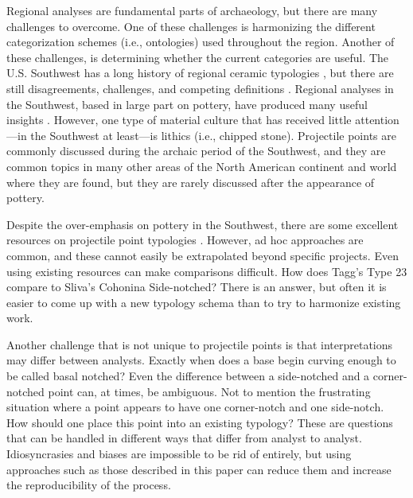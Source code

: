 \documentclass[PCJ,Unicode,screen,mode=plain]{cedram}
\begin{document}
Regional analyses are fundamental parts of archaeology, but there are many challenges to overcome. One of these challenges is harmonizing the different categorization schemes (i.e., ontologies) used throughout the region. Another of these challenges, is determining whether the current categories are useful. The U.S. Southwest has a long history of regional ceramic typologies \autocites[e.g.,][]{Colton1956-zy,gladwin1930a,Hargrave1932-ng,Kidder1915-ae,Martin1940-jg}, but there are still disagreements, challenges, and competing definitions \autocite{Duff1996-au}. Regional analyses in the Southwest, based in large part on pottery, have produced many useful insights \autocites[e.g.,][]{Bernardini2005-ue,Clark2019-bz,Hegmon2016-xw,Mills2013-wq,Peeples2018-ib}. However, one type of material culture that has received little attention---in the Southwest at least---is lithics (i.e., chipped stone). Projectile points are commonly discussed during the archaic period of the Southwest, and they are common topics in many other areas of the North American continent and world where they are found, but they are rarely discussed after the appearance of pottery.

Despite the over-emphasis on pottery in the Southwest, there are some excellent resources on projectile point typologies \autocites[e.g.,][]{Hoffman1997-hb,Justice2002-cf,Loendorf2004-tp,Sliva2006-nq}. However, ad hoc approaches are common, and these cannot easily be extrapolated beyond specific projects. Even using existing resources can make comparisons difficult. How does Tagg's \autocite*[p.111]{Tagg1994-wi} Type 23 compare to Sliva's \autocite*[p.~35]{Sliva2006-nq} Cohonina Side-notched? There is an answer, but often it is easier to come up with a new typology schema than to try to harmonize existing work.

Another challenge that is not unique to projectile points is that interpretations may differ between analysts. Exactly when does a base begin curving enough to be called basal notched? Even the difference between a side-notched and a corner-notched point can, at times, be ambiguous. Not to mention the frustrating situation where a point appears to have one corner-notch and one side-notch. How should one place this point into an existing typology? These are questions that can be handled in different ways that differ from analyst to analyst. Idiosyncrasies and biases are impossible to be rid of entirely, but using approaches such as those described in this paper can reduce them and increase the reproducibility of the process.
\end{document}
